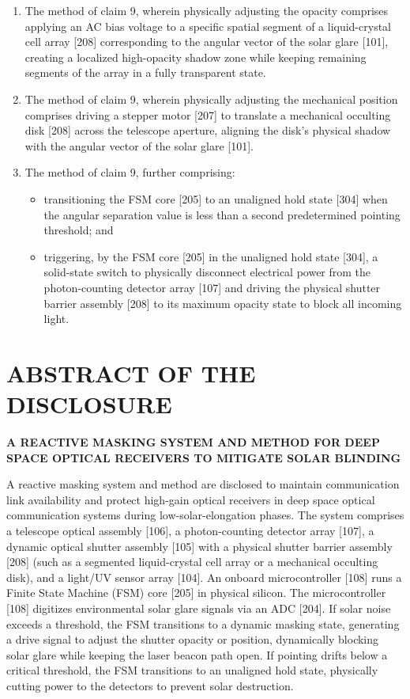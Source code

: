 \documentclass[12pt,a4paper]{article}
\begin{document}
\begin{enumerate}
    \item The method of claim 9, wherein physically adjusting the opacity comprises applying an AC bias voltage to a specific spatial segment of a liquid-crystal cell array [208] corresponding to the angular vector of the solar glare [101], creating a localized high-opacity shadow zone while keeping remaining segments of the array in a fully transparent state.

    \item The method of claim 9, wherein physically adjusting the mechanical position comprises driving a stepper motor [207] to translate a mechanical occulting disk [208] across the telescope aperture, aligning the disk's physical shadow with the angular vector of the solar glare [101].

    \item The method of claim 9, further comprising:
    \begin{itemize}
        \item transitioning the FSM core [205] to an unaligned hold state [304] when the angular separation value is less than a second predetermined pointing threshold; and
        \item triggering, by the FSM core [205] in the unaligned hold state [304], a solid-state switch to physically disconnect electrical power from the photon-counting detector array [107] and driving the physical shutter barrier assembly [208] to its maximum opacity state to block all incoming light.
    \end{itemize}

\end{enumerate}

\newpage

\section*{ABSTRACT OF THE DISCLOSURE}
\textbf{A REACTIVE MASKING SYSTEM AND METHOD FOR DEEP SPACE OPTICAL RECEIVERS TO MITIGATE SOLAR BLINDING} \\
\vspace{0.5cm}

A reactive masking system and method are disclosed to maintain communication link availability and protect high-gain optical receivers in deep space optical communication systems during low-solar-elongation phases. The system comprises a telescope optical assembly [106], a photon-counting detector array [107], a dynamic optical shutter assembly [105] with a physical shutter barrier assembly [208] (such as a segmented liquid-crystal cell array or a mechanical occulting disk), and a light/UV sensor array [104]. An onboard microcontroller [108] runs a Finite State Machine (FSM) core [205] in physical silicon. The microcontroller [108] digitizes environmental solar glare signals via an ADC [204]. If solar noise exceeds a threshold, the FSM transitions to a dynamic masking state, generating a drive signal to adjust the shutter opacity or position, dynamically blocking solar glare while keeping the laser beacon path open. If pointing drifts below a critical threshold, the FSM transitions to an unaligned hold state, physically cutting power to the detectors to prevent solar destruction.
\end{document}
